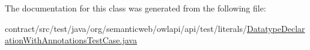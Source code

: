 The documentation for this class was generated from the following file\-:\begin{DoxyCompactItemize}
\item 
contract/src/test/java/org/semanticweb/owlapi/api/test/literals/\hyperlink{_datatype_declaration_with_annotations_test_case_8java}{Datatype\-Declaration\-With\-Annotations\-Test\-Case.\-java}\end{DoxyCompactItemize}
